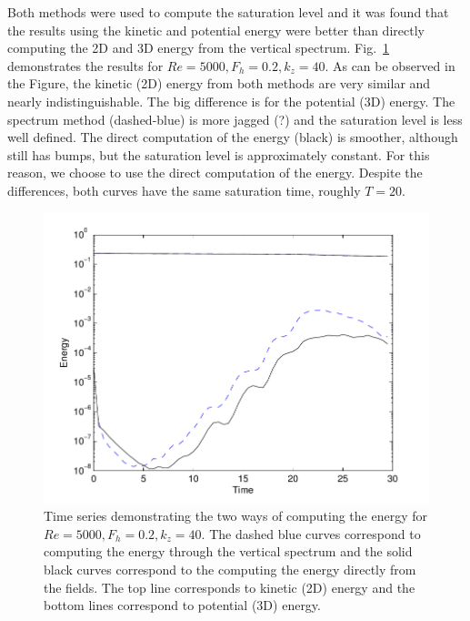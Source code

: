 Both methods were used to compute the saturation level and it was found that the results using the kinetic and potential energy were better than directly computing the 2D and 3D energy from the vertical spectrum. Fig.~\ref{sat_energy} demonstrates the results for $Re=5000, F_{h}=0.2, k_{z}=40$. As can be observed in the Figure, the kinetic (2D) energy from both methods are very similar and nearly indistinguishable. The big difference is for the potential (3D) energy. The spectrum method (dashed-blue) is more jagged (?) and the saturation level is less well defined. The direct computation of the energy (black) is smoother, although still has bumps, but the saturation level is approximately constant. For this reason, we choose to use the direct computation of the energy. Despite the differences, both curves have the same saturation time, roughly $T=20$. 
\begin{figure}
\begin{center}
\includegraphics[width=\textwidth]{sat_eg_re5000_fh02}
\caption{Time series demonstrating the two ways of computing the energy for $Re=5000, F_{h}=0.2, k_{z}=40$. The dashed blue curves correspond to computing the energy through the vertical spectrum and the solid black curves correspond to the computing the energy directly from the fields. The top line corresponds to kinetic (2D) energy and the bottom lines correspond to potential (3D) energy.}
\label{sat_energy}
\end{center}
\end{figure}

